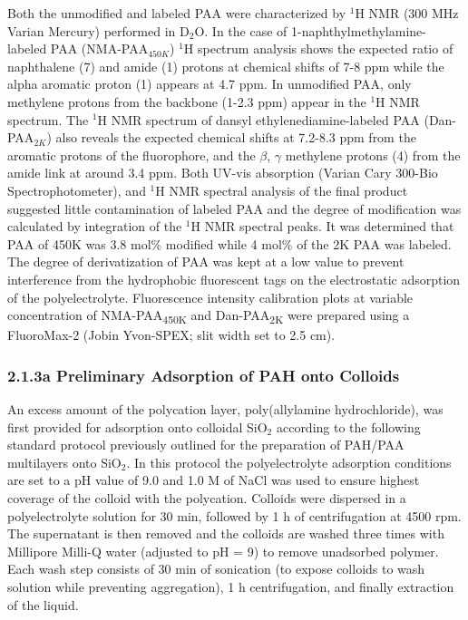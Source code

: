 \documentclass[journal=mamobx,manuscript=article]{achemso}
\begin{document}
Both the unmodified and labeled PAA were characterized by $^{1}$H NMR (300 MHz Varian Mercury) performed in D$_2$O.  In the case of 1-naphthylmethylamine-labeled PAA (NMA-PAA$_{450K}$) $^1$H   spectrum analysis shows the expected ratio of naphthalene (7) and amide (1) protons at chemical shifts of 7-8 ppm while the alpha aromatic proton (1) appears at 4.7 ppm.  In unmodified PAA, only methylene protons from the backbone (1-2.3 ppm) appear in the $^1$H NMR spectrum.  The $^1$H NMR spectrum of dansyl ethylenediamine-labeled PAA (Dan-PAA$_{2K}$) also reveals the expected chemical shifts at 7.2-8.3 ppm from the aromatic protons of the fluorophore, and the $\beta$, $\gamma$ methylene protons (4) from the amide link at around 3.4 ppm.  Both UV-vis absorption (Varian Cary 300-Bio Spectrophotometer), and $^{1}$H NMR spectral analysis of the final product suggested little contamination of labeled PAA and the degree of modification was calculated by integration of the $^{1}$H NMR spectral peaks.  It was determined that PAA of 450K was 3.8 mol\% modified while 4 mol\% of the 2K PAA was labeled.  The degree of derivatization of PAA was kept at a low value to prevent interference from the hydrophobic fluorescent tags on the electrostatic adsorption of the polyelectrolyte.  Fluorescence intensity calibration plots at variable concentration of NMA-PAA\textsubscript{450K} and Dan-PAA\textsubscript{2K} were prepared using a FluoroMax-2 (Jobin Yvon-SPEX; slit width set to 2.5 cm). 

\subsubsection{2.1.3a Preliminary Adsorption of PAH onto Colloids}   %
    \label{sec-prelPAH}


An excess amount of the polycation layer, poly(allylamine hydrochloride), was first provided for adsorption onto colloidal SiO$_2$ according to the following standard protocol previously outlined for the preparation of PAH/PAA multilayers onto SiO$_2$.\cite{Burke2003}  In this protocol the polyelectrolyte adsorption conditions are set to a pH value of 9.0 and 1.0 M of NaCl was used to ensure highest coverage of the colloid with the polycation.  Colloids were dispersed in a polyelectrolyte solution for 30 min, followed by 1 h of centrifugation at 4500 rpm.  The supernatant is then removed and the colloids are washed three times with Millipore Milli-Q water (adjusted to pH = 9) to remove unadsorbed polymer.  Each wash step consists of 30 min of sonication (to expose colloids to wash solution while preventing aggregation), 1 h centrifugation, and finally extraction of the liquid.  
\end{document}
